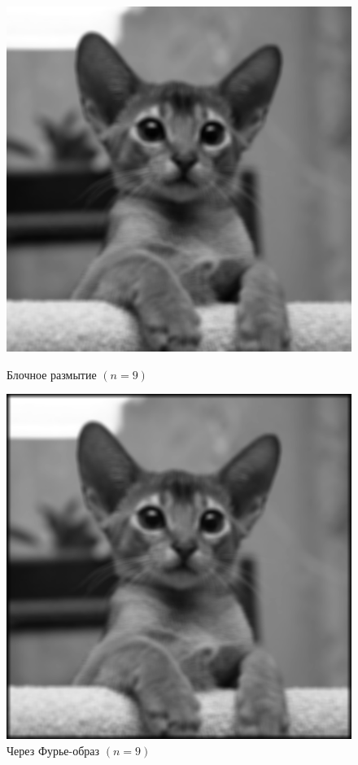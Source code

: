 \documentclass[a4paper]{article}
\begin{document}
\begin{figure}[H]
    \hspace{5em}
    \begin{minipage}{0.35\textwidth}
        \includegraphics[width=\textwidth]{sources/2second/block_9.png}
        \caption{Блочное размытие $(n = 9)$}
    \end{minipage}\hfill
    \begin{minipage}{0.35\textwidth}
        \includegraphics[width=\textwidth]{sources/2second/block_fft_9.png}
        \caption{Через Фурье-образ $(n = 9)$}
    \end{minipage}
    \hspace{5em}
\end{figure}
\end{document}
